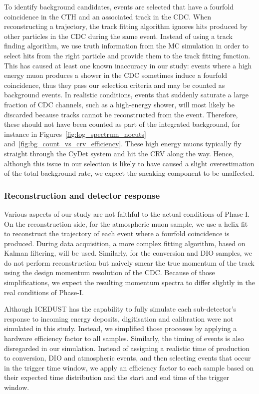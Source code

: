 To identify background candidates, events are selected that have a fourfold
coincidence in the CTH and an associated track in the CDC. When reconstructing a
trajectory, the track fitting algorithm ignores hits produced by other particles
in the CDC during the same event. Instead of using a track finding algorithm, we
use truth information from the MC simulation in order to select hits from the
right particle and provide them to the track fitting function. This has caused
at least one known inaccuracy in our study: events where a high energy muon
produces a shower in the CDC sometimes induce a fourfold coincidence, thus they
pass our selection criteria and may be counted as background events. In
realistic conditions, events that suddenly saturate a large fraction of CDC
channels, such as a high-energy shower, will most likely be discarded because
tracks cannot be reconstructed from the event. Therefore, these should not have
been counted as part of the integrated background, for instance in
Figures~\ref{fig:log_spectrum_nocuts} and~\ref{fig:bg_count_vs_crv_efficiency}.
These high energy muons typically fly straight through the CyDet system and hit
the CRV along the way. Hence, although this issue in our selection is likely to
have caused a slight overestimation of the total background rate, we expect the
sneaking component to be unaffected.

\subsubsection{Reconstruction and detector response}
Various aspects of our study are not faithful to the actual conditions of
Phase\nobreakdash-I. On the reconstruction side, for the atmospheric muon sample, we use a
helix fit to reconstruct the trajectory of each event where a fourfold
coincidence is produced. During data acquisition, a more complex fitting
algorithm, based on Kalman filtering, will be used. Similarly, for the
conversion and DIO samples, we do not perform reconstruction but naively
smear the true momentum of the track using the design momentum resolution of the
CDC. Because of those simplifications, we expect the resulting momentum spectra
to differ slightly in the real conditions of Phase\nobreakdash-I. 

Although ICEDUST has the capability to fully simulate each sub-detector's
response to incoming energy deposits, digitisation and calibration were not
simulated in this study. Instead, we simplified those processes by applying a
hardware efficiency factor to all samples. Similarly, the timing of events is
also disregarded in our simulation. Instead of assigning a realistic time of
production to conversion, DIO and atmospheric events, and then selecting events
that occur in the trigger time window, we apply an efficiency factor to each
sample based on their expected time distribution and the start and end time of
the trigger window. 

